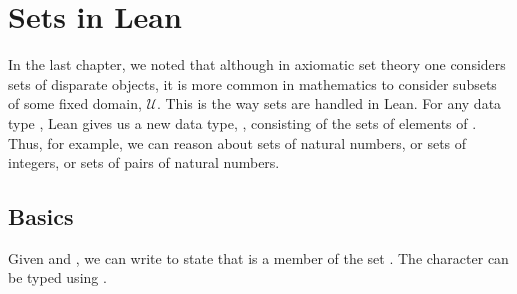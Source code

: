 \documentclass[letterpaper,10pt,english]{sphinxmanual}
\begin{document}
\chapter{Sets in Lean}
\label{\detokenize{sets_in_lean:sets-in-lean}}\label{\detokenize{sets_in_lean::doc}}
\sphinxAtStartPar
In the last chapter, we noted that although in axiomatic set theory one considers sets of disparate objects, it is more common in mathematics to consider subsets of some fixed domain, \(\mathcal U\). This is the way sets are handled in Lean. For any data type , Lean gives us a new data type, , consisting of the sets of elements of . Thus, for example, we can reason about sets of natural numbers, or sets of integers, or sets of pairs of natural numbers.


\section{Basics}
\label{\detokenize{sets_in_lean:basics}}\label{\detokenize{sets_in_lean:sets-in-lean-basics}}
\sphinxAtStartPar
Given  and , we can write  to state that  is a member of the set . The character  can be typed using .

\begin{sphinxVerbatim}[commandchars=\\\{\}]
 
 

   
      
   

   
   
   
   
 
   
   
\end{sphinxVerbatim}
\end{document}
